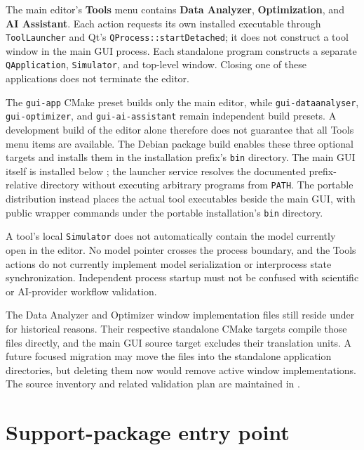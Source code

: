 The main editor's \textbf{Tools} menu contains \textbf{Data Analyzer},
\textbf{Optimization}, and \textbf{AI Assistant}. Each action requests
its own installed executable through \texttt{ToolLauncher} and Qt's
\texttt{QProcess::startDetached}; it does not construct a tool window in
the main GUI process. Each standalone program constructs a separate
\texttt{QApplication}, \texttt{Simulator}, and top-level window. Closing
one of these applications does not terminate the editor.

The \texttt{gui-app} CMake preset builds only the main editor, while
\texttt{gui-dataanalyser}, \texttt{gui-optimizer}, and
\texttt{gui-ai-assistant} remain independent build presets. A development
build of the editor alone therefore does not guarantee that all Tools
menu items are available. The Debian package build enables these three
optional targets and installs them in the installation prefix's
\texttt{bin} directory. The main GUI itself is installed below
; the launcher service resolves the
documented prefix-relative directory without executing arbitrary
programs from \texttt{PATH}. The portable distribution instead places
the actual tool executables beside the main GUI, with public wrapper
commands under the portable installation's \texttt{bin} directory.

A tool's local \texttt{Simulator} does not automatically contain the
model currently open in the editor. No model pointer crosses the process
boundary, and the Tools actions do not currently implement model
serialization or interprocess state synchronization. Independent
process startup must not be confused with scientific or AI-provider
workflow validation.

The Data Analyzer and Optimizer window implementation files still
reside under  for historical
reasons. Their respective standalone CMake targets compile those
files directly, and the main GUI source target excludes their
translation units. A future focused migration may move the files
into the standalone application directories, but deleting them now
would remove active window implementations. The source inventory and
related validation plan are maintained in
.

\section{Support-package entry point}

